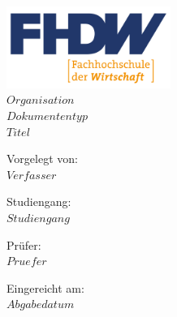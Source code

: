 \begin{center}
\includegraphics[width=0.4\textwidth]{./img/fhdw.png}\\
\Large{$Organisation$}
\vspace{2mm}\\
\Large{\bfseries $Dokumententyp$}
\vspace{6mm}\\
\LARGE{$Titel$}
\vfill

\large{
Vorgelegt von:\vspace{2mm}\\
$Verfasser$

\vfill
Studiengang:\vspace{2mm}\\
$Studiengang$

\vfill
Prüfer:\vspace{2mm}\\
$Pruefer$

\vfill
Eingereicht am:\vspace{2mm}\\
$Abgabedatum$
}
\end{center}
